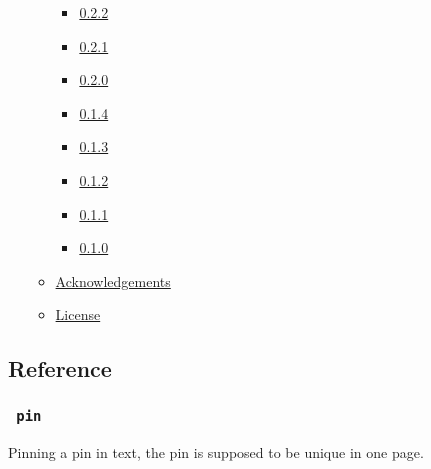 \begin{itemize}
\begin{itemize}
    \begin{itemize}
    \tightlist
    \item
      \href{https://github.com/typst/packages/raw/main/packages/preview/pinit/0.2.2/\#022}{0.2.2}
    \item
      \href{https://github.com/typst/packages/raw/main/packages/preview/pinit/0.2.2/\#021}{0.2.1}
    \item
      \href{https://github.com/typst/packages/raw/main/packages/preview/pinit/0.2.2/\#020}{0.2.0}
    \item
      \href{https://github.com/typst/packages/raw/main/packages/preview/pinit/0.2.2/\#014}{0.1.4}
    \item
      \href{https://github.com/typst/packages/raw/main/packages/preview/pinit/0.2.2/\#013}{0.1.3}
    \item
      \href{https://github.com/typst/packages/raw/main/packages/preview/pinit/0.2.2/\#012}{0.1.2}
    \item
      \href{https://github.com/typst/packages/raw/main/packages/preview/pinit/0.2.2/\#011}{0.1.1}
    \item
      \href{https://github.com/typst/packages/raw/main/packages/preview/pinit/0.2.2/\#010}{0.1.0}
    \end{itemize}
  \item
    \href{https://github.com/typst/packages/raw/main/packages/preview/pinit/0.2.2/\#acknowledgements}{Acknowledgements}
  \item
    \href{https://github.com/typst/packages/raw/main/packages/preview/pinit/0.2.2/\#license}{License}
  \end{itemize}
\end{itemize}

\subsection{Reference}\label{reference}

\subsubsection{\texorpdfstring{\texttt{\ pin\ }}{ pin }}\label{pin}

Pinning a pin in text, the pin is supposed to be unique in one page.

\begin{Shaded}
\begin{Highlighting}[]
\end{Highlighting}
\end{Shaded}

